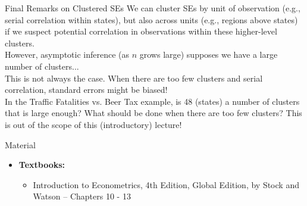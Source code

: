 \documentclass[notes,10pt, aspectratio=169]{beamer}
\begin{document}
\begin{frame}{Final Remarks on Clustered SEs}
We can cluster SEs by unit of observation (e.g., serial correlation within states), but also across units (e.g., regions above states) if we suspect potential correlation in observations within these higher-level clusters.\\[1em]

However, asymptotic inference (as $n$ grows large) supposes we have a large number of clusters...\\[1em]%

This is not always the case. When there are too few clusters and serial correlation, standard errors might be biased!\\[1em]

In the Traffic Fatalities vs. Beer Tax example, is 48 (states) a number of clusters that is large enough? What should be done when there are too few clusters? This is out of the scope of this (introductory) lecture!
\end{frame}


\begin{frame}[allowframebreaks]{Material}
\begin{itemize}
    \item[--] \textbf{Textbooks:}
    \begin{itemize}
        \item Introduction to Econometrics, 4th Edition, Global Edition, by Stock and Watson -- Chapters 10 - 13
    \end{itemize}
\end{itemize}
\end{frame}
\end{document}
